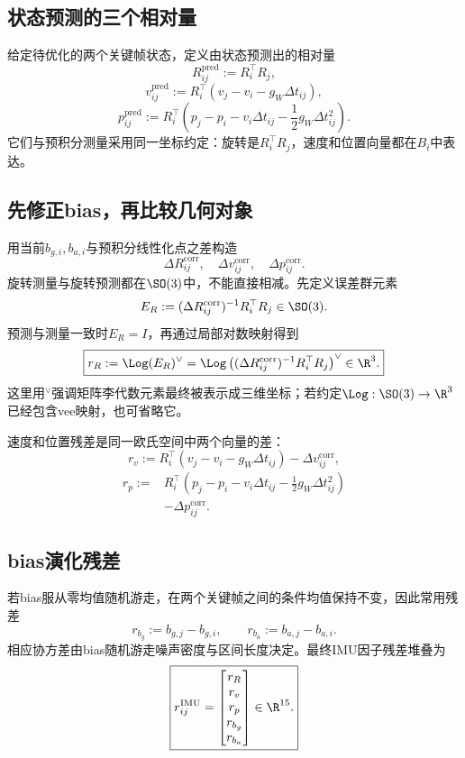\subsection{状态预测的三个相对量}

给定待优化的两个关键帧状态，定义由状态预测出的相对量
\[
    R_{ij}^{\mathrm{pred}}:=R_i^\top R_j,
\]
\[
    v_{ij}^{\mathrm{pred}}
    :=R_i^\top(v_j-v_i-g_W\Delta t_{ij}),
\]
\[
    p_{ij}^{\mathrm{pred}}
    :=R_i^\top
      \left(
        p_j-p_i-v_i\Delta t_{ij}
        -\frac12g_W\Delta t_{ij}^2
      \right).
\]
它们与预积分测量采用同一坐标约定：旋转是$R_i^\top R_j$，速度和位置向量都在$B_i$中表达。

\subsection{先修正bias，再比较几何对象}

用当前$b_{g,i},b_{a,i}$与预积分线性化点之差构造
\[
    \Delta R_{ij}^{\mathrm{corr}},
    \quad
    \Delta v_{ij}^{\mathrm{corr}},
    \quad
    \Delta p_{ij}^{\mathrm{corr}}.
\]
旋转测量与旋转预测都在$\SO(3)$中，不能直接相减。先定义误差群元素
\[
    E_R
    :=(\Delta R_{ij}^{\mathrm{corr}})^{-1}
      R_i^\top R_j
    \in\SO(3).
\]
预测与测量一致时$E_R=I$，再通过局部对数映射得到
\[
\boxed{
    r_R
    :=\Log(E_R)^\vee
    =\Log\left(
      (\Delta R_{ij}^{\mathrm{corr}})^{-1}R_i^\top R_j
    \right)^\vee
    \in\R^3.
}
\]
这里用$^\vee$强调矩阵李代数元素最终被表示成三维坐标；若约定$\Log:\SO(3)\to\R^3$已经包含vee映射，也可省略它。

速度和位置残差是同一欧氏空间中两个向量的差：
\[
\boxed{
    r_v
    :=R_i^\top(v_j-v_i-g_W\Delta t_{ij})
      -\Delta v_{ij}^{\mathrm{corr}},
}
\]
\[
\boxed{
\begin{aligned}
    r_p
    :={}&R_i^\top
      \left(
        p_j-p_i-v_i\Delta t_{ij}
        -\frac12g_W\Delta t_{ij}^2
      \right)\\
      &-\Delta p_{ij}^{\mathrm{corr}}.
\end{aligned}
}
\]

\subsection{bias演化残差}

若bias服从零均值随机游走，在两个关键帧之间的条件均值保持不变，因此常用残差
\[
\boxed{
    r_{b_g}:=b_{g,j}-b_{g,i},
    \qquad
    r_{b_a}:=b_{a,j}-b_{a,i}.
}
\]
相应协方差由bias随机游走噪声密度与区间长度决定。最终IMU因子残差堆叠为
\[
\boxed{
    r_{ij}^{\mathrm{IMU}}
    =
    \begin{bmatrix}
        r_R\\r_v\\r_p\\r_{b_g}\\r_{b_a}
    \end{bmatrix}
    \in\R^{15}.
}
\]

